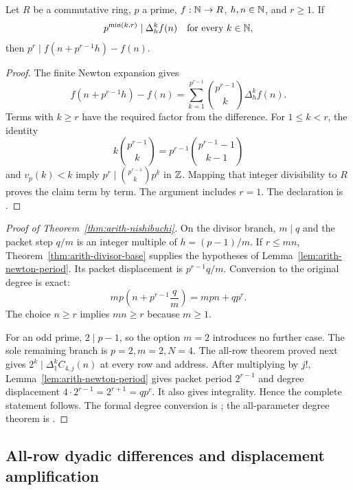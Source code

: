 \begin{lemma}
\label{lem:arith-newton-period}
Let $R$ be a commutative ring, $p$ a prime, $f:\mathbb N\to R$, $h,n\in\mathbb N$,
and $r\ge1$.  If
\[
 p^{\min(k,r)}\mid\Delta_h^k f(n)\quad\text{for every }k\in\mathbb N,
\]
then $p^r\mid f(n+p^{r-1}h)-f(n)$.
\end{lemma}

\begin{proof}
The finite Newton expansion gives
\[
 f(n+p^{r-1}h)-f(n)
 =\sum_{k=1}^{p^{r-1}}\binom{p^{r-1}}k\Delta_h^k f(n).
\]
Terms with $k\ge r$ have the required factor from the difference.
For $1\le k<r$, the identity
\[
 k\binom{p^{r-1}}k=p^{r-1}\binom{p^{r-1}-1}{k-1}
\]
and $v_p(k)<k$ imply
$p^r\mid\binom{p^{r-1}}k p^k$ in $\mathbb Z$.
Mapping that integer divisibility to $R$ proves the claim term by term.
The argument includes $r=1$.
The declaration is
.
\end{proof}

\begin{proof}[Proof of Theorem~\ref{thm:arith-nishibuchi}]
On the divisor branch, $m\mid q$ and the packet step $q/m$ is an integer
multiple of $h=(p-1)/m$.  If $r\le mn$, Theorem~\ref{thm:arith-divisor-base}
supplies the hypotheses of Lemma~\ref{lem:arith-newton-period}.
Its packet displacement is $p^{r-1}q/m$.  Conversion to the original
degree is exact:
\[
 mp\left(n+p^{r-1}\frac qm\right)=mpn+qp^r.
\]
The choice $n\ge r$ implies $mn\ge r$ because $m\ge1$.

For an odd prime, $2\mid p-1$, so the option $m=2$ introduces no further
case.  The sole remaining branch is $p=2,m=2,N=4$.  The all-row theorem
proved next gives $2^k\mid\Delta_1^kC_{4,j}(n)$ at every row and address.
After multiplying by $j!$, Lemma~\ref{lem:arith-newton-period} gives packet
period $2^{r-1}$ and degree displacement $4\cdot2^{r-1}=2^{r+1}=qp^r$.
It also gives integrality.  Hence the complete statement follows.
The formal degree conversion is
;
the all-parameter degree theorem is
.
\end{proof}

\subsection{All-row dyadic differences and displacement amplification}

